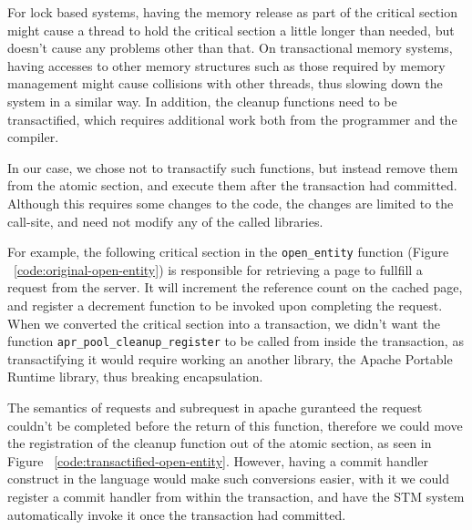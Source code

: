 \documentclass[preprint,natbib,11pt]{sigplanconf}
\begin{document}
For lock based systems, having the memory release as part of the critical
section might cause a thread to hold the critical section a little longer than
needed, but doesn't cause any problems other than that. On transactional memory
systems, having accesses to other memory structures such as those required by
memory management might cause collisions with other threads, thus slowing down
the system in a similar way. In addition, the cleanup functions need to be
transactified, which requires additional work both from the programmer and the
compiler.

In our case, we chose not to transactify such functions, but instead remove them
from the atomic section, and execute them after the transaction had committed.
Although this requires some changes to the code, the changes are limited to the
call-site, and need not modify any of the called libraries.

For example, the following critical section in the {\tt open\_entity} function
(Figure ~\ref{code:original-open-entity}) is responsible for retrieving a page
to fullfill a request from the server. It will increment the reference count on
the cached page, and register a decrement function to be invoked upon completing
the request. When we converted the critical section into a transaction, we
didn't want the function {\tt apr\_pool\_cleanup\_register} to be called from
inside the transaction, as transactifying it would require working an another
library, the Apache Portable Runtime library, thus breaking encapsulation.

The semantics of requests and subrequest in apache guranteed the request
couldn't be completed before the return of this function, therefore we could
move the registration of the cleanup function out of the atomic section, as seen
in Figure ~\ref{code:transactified-open-entity}. However, having a commit
handler construct in the language would make such conversions easier, with it we
could register a commit handler from within the transaction, and have the STM
system automatically invoke it once the transaction had committed.
\end{document}
